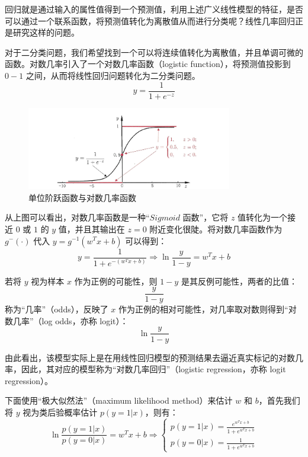 \documentclass[12pt, a4paper]{article} %
\begin{document}
回归就是通过输入的属性值得到一个预测值，利用上述广义线性模型的特征，是否可以通过一个联系函数，将预测值转化为离散值从而进行分类呢？线性几率回归正是研究这样的问题。

对于二分类问题，我们希望找到一个可以将连续值转化为离散值，并且单调可微的函数。对数几率引入了一个对数几率函数（logistic function），将预测值投影到 $0-1$ 之间，从而将线性回归问题转化为二分类问题。
\begin{equation*}
    y = \frac{1}{1 + e^{-z}}
\end{equation*}

\begin{figure}[H]
    \centering
    \includegraphics[width=0.8\textwidth]{../img/3-2-单位阶跃函数与对数几率函数.png}
    \caption{单位阶跃函数与对数几率函数}
    \label{fig:单位阶跃函数与对数几率函数}
\end{figure}

从上图可以看出，对数几率函数是一种“$Sigmoid$ 函数”，它将 $z$ 值转化为一个接近 $0$ 或 $1$ 的 $y$ 值，并且其输出在 $z = 0$ 附近变化很陡。将对数几率函数作为 $g^-(\cdot)$ 代入 $y = g^{-1} (w^T x + b)$ 可以得到：
\begin{equation*}
    y = \frac{1}{1 + e^{- (w^T x + b)}} \Rightarrow \ln \frac{y}{1 - y} = w^Tx + b
\end{equation*}

若将 $y$ 视为样本 $x$ 作为正例的可能性，则 $1 - y$ 是其反例可能性，两者的比值：
\begin{equation*}
    \frac{y}{1 - y}
\end{equation*}
称为“几率”（odds），反映了 $x$ 作为正例的相对可能性，对几率取对数则得到“对数几率”（log odds，亦称 logit）：
\begin{equation*}
    \ln \frac{y}{1 - y}
\end{equation*}

由此看出，该模型实际上是在用线性回归模型的预测结果去逼近真实标记的对数几率，因此，其对应的模型称为“对数几率回归”（logistic regression，亦称 logit regression）。

下面使用“极大似然法”（maximum likelihood method）来估计 $w$ 和 $b$，首先我们将 $y$ 视为类后验概率估计 $p(y = 1 | x)$，则有：
\begin{equation*}
    \ln \frac{{p(y = 1|x)}}{{p(y = 0|x)}} = {w^T}x + b \Rightarrow \left\{ \begin{array}{l}
        \displaystyle p(y = 1|x) = \frac{{{e^{{w^T}x + b}}}}{{1 + {e^{{w^T}x + b}}}}\\
        \displaystyle p(y = 0|x) = \frac{1}{{1 + {e^{{w^T}x + b}}}}
    \end{array} \right.
\end{equation*}
\end{document}
